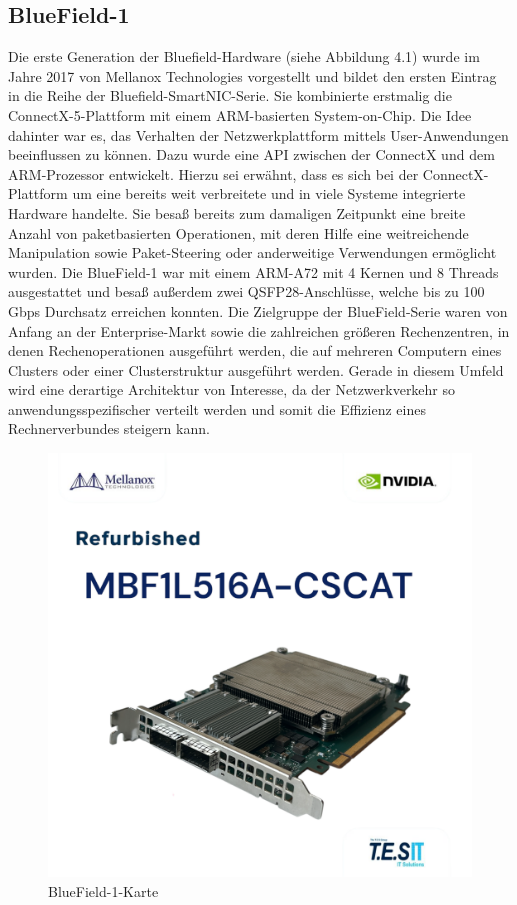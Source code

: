 \subsection{BlueField-1}
Die erste Generation der Bluefield-Hardware (siehe Abbildung 4.1) wurde im Jahre 2017 von Mellanox Technologies vorgestellt und bildet den ersten Eintrag in die Reihe der Bluefield-SmartNIC-Serie. Sie kombinierte erstmalig die ConnectX-5-Plattform mit einem ARM-basierten System-on-Chip. Die Idee dahinter war es, das Verhalten der Netzwerkplattform mittels User-Anwendungen beeinflussen zu können. Dazu wurde eine API zwischen der ConnectX und dem ARM-Prozessor entwickelt. Hierzu sei erwähnt, dass es sich bei der ConnectX-Plattform um eine bereits weit verbreitete und in viele Systeme integrierte Hardware handelte. Sie besaß bereits zum damaligen Zeitpunkt eine breite Anzahl von paketbasierten Operationen, mit deren Hilfe eine weitreichende Manipulation sowie Paket-Steering oder anderweitige Verwendungen ermöglicht wurden. Die BlueField-1 war mit einem ARM-A72 mit 4 Kernen und 8 Threads ausgestattet und besaß außerdem zwei QSFP28-Anschlüsse, welche bis zu 100 Gbps Durchsatz erreichen konnten. Die Zielgruppe der BlueField-Serie waren von Anfang an der Enterprise-Markt sowie die zahlreichen größeren Rechenzentren, in denen Rechenoperationen ausgeführt werden, die auf mehreren Computern eines Clusters oder einer Clusterstruktur ausgeführt werden. Gerade in diesem Umfeld wird eine derartige Architektur von Interesse, da der Netzwerkverkehr so anwendungsspezifischer verteilt werden und somit die Effizienz eines Rechnerverbundes steigern kann. \cite{bluefieldhistory}
\begin{figure}
    \centering
    \includegraphics[width=0.65\linewidth]{images/s-l1600.png}
    \caption{BlueField-1-Karte \cite{ebay_bluefield1_2025}}
    \label{fig:enter-label}
\end{figure}
